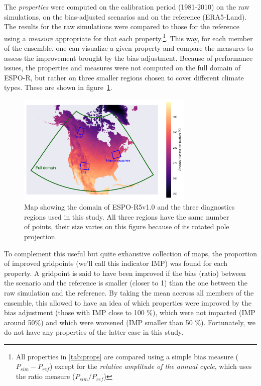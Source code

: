 \documentclass[letterpaper,10pt]{article}
\begin{document}
The \emph{properties} were computed on the calibration period (1981-2010) on the raw simulations, on the bias-adjusted scenarios and on the reference (ERA5-Land). The results for the raw simulations were compared to those for the reference using a \emph{measure} appropriate for that each property.\footnote{All properties in \ref{tab:props} are compared using a simple bias measure ($P_{sim} - P_{ref}$) except for the \emph{relative amplitude of the annual cycle}, which uses the ratio measure ($P_{sim} / P_{ref}$)}. This way, for each member of the ensemble, one can visualize a given property and compare the measures to assess the improvement brought by the bias adjustment. Because of performance issues, the properties and measures were not computed on the full domain of ESPO-R, but rather on three smaller regions chosen to cover different climate types. These are shown in figure~\ref{fig:map}.

\begin{figure}
    \centering
    \includegraphics[width=0.75\textwidth]{../images/regions_domain_map.pdf}
    \caption{Map showing the domain of ESPO-R5v1.0 and the three diagnostics regions used in this study. All three regions have the same number of points, their size varies on this figure because of its rotated pole projection.}\label{fig:map}
\end{figure}

To complement this useful but quite exhaustive collection of maps, the proportion of improved gridpoints (we'll call this indicator IMP) was found for each property. A gridpoint is said to have been improved if the bias (ratio) between the scenario and the reference is smaller (closer to 1) than the one between the raw simulation and the reference. By taking the mean accross all members of the ensemble, this allowed to have an idea of which properties were improved by the bias adjustment (those with IMP close to 100 \%), which were not impacted (IMP around 50\%) and which were worsened (IMP smaller than 50 \%). Fortunately, we do not have any properties of the latter case in this study.
\end{document}

